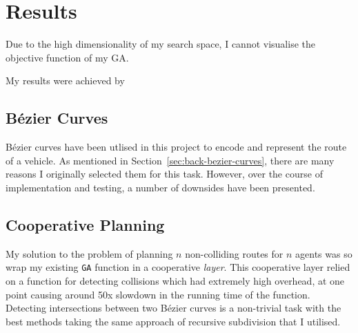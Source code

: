 \section{Results}

Due to the high dimensionality of my search space, I cannot visualise the objective function of my GA.

My results were achieved by
\subsection{Bézier Curves}

Bézier curves have been utlised in this project to encode and represent the route of a vehicle. As mentioned in Section~\ref{sec:back-bezier-curves}, there are many reasons I originally selected them for this task. However, over the course of implementation and testing, a number of downsides have been presented.

\subsection{Cooperative Planning}
\label{subsec:eval-cooperativeplanning}

My solution to the problem of planning $n$ non-colliding routes for $n$ agents was so wrap my existing \texttt{GA} function in a cooperative \textit{layer}. This cooperative layer relied on a function for detecting collisions which had extremely high overhead, at one point causing around 50x slowdown in the running time of the function. Detecting intersections between two Bézier curves is a non-trivial task with the best methods taking the same approach of recursive subdivision that I utilised.




